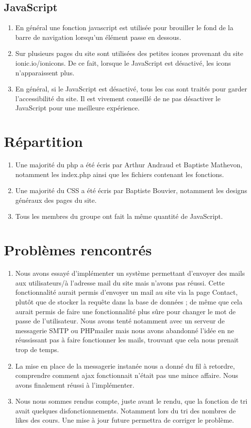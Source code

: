 \documentclass[12pt,a4paper]{article}
\begin{document}
\subsection{JavaScript}
\begin{enumerate}
    \item En général une fonction javascript est utilisée pour brouiller le fond de la barre de navigation lorsqu'un élément passe en dessous.
    \item Sur plusieurs pages du site sont utilisées des petites icones provenant du site ionic.io/ionicons. De ce fait, lorsque le JavaScript est désactivé, les icons n'apparaissent plus.
    \item En général, si le JavaScript est désactivé, tous les cas sont traités pour garder l'accessibilité du site. Il est vivement conseillé de ne pas désactiver le JavaScript pour une meilleure expérience.
\end{enumerate}

\section{Répartition}
\begin{enumerate}
    \item Une majorité du php a été écris par Arthur Andraud et Baptiste Mathevon, notamment les index.php ainsi que les fichiers contenant les fonctions.
    \item Une majorité du CSS a été écris par Baptiste Bouvier, notamment les designs généraux des pages du site.
    \item Tous les membres du groupe ont fait la même quantité de JavaScript.
\end{enumerate}

\section{Problèmes rencontrés}
\begin{enumerate}
    \item Nous avons essayé d'implémenter un système permettant d'envoyer des mails aux utilisateurs/à l'adresse mail du site mais n'avons pas réussi. Cette fonctionnalité aurait permis d'envoyer un mail au site via la page Contact, plutôt que de stocker la requête dans la base de données ; de même que cela aurait permis de faire une fonctionnalité plus sûre pour changer le mot de passe de l'utilisateur. Nous avons tenté notamment avec un serveur de messagerie SMTP ou PHPmailer mais nous avons abandonné l'idée en ne réussissant pas à faire fonctionner les mails, trouvant que cela nous prenait trop de temps.
    \item La mise en place de la messagerie instanée nous a donné du fil à retordre, comprendre comment ajax fonctionnait n'était pas une mince affaire. Nous avons finalement réussi à l'implémenter.
    \item Nous nous sommes rendus compte, juste avant le rendu, que la fonction de tri avait quelques disfonctionnements. Notamment lors du tri des nombres de likes des cours. Une mise à jour future permettra de corriger le problème.
\end{enumerate}
\end{document}
